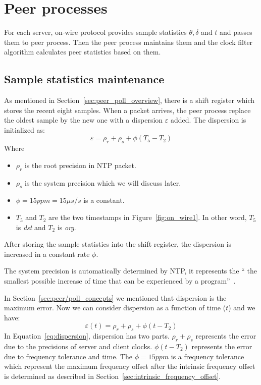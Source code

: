 \section{Peer processes}%
\label{sec:peer_processes}
For each server, on-wire protocol provides sample statistics $\theta, \delta$
and $t$ and passes them to peer process. Then the peer process maintains them
and the clock filter algorithm calculates peer statistics based on them.

\subsection{Sample statistics maintenance}%
\label{sub:sample_statistics_maintenance}
As mentioned in Section~\ref{sec:peer_poll_overview}, there is a shift register
which stores the recent eight samples. When a packet arrives, the peer process
replace the oldest sample by the new one with a dispersion $\varepsilon$ added.
The dispersion is initialized as:
$$ \varepsilon = \rho_r + \rho_s + \phi (T_5 - T_2) $$
Where 
\begin{itemize}
    \item 
        $\rho_r$ is the root precision in NTP packet. 
    \item 
        $\rho_s$ is the system
        precision which we will discuss later.
    \item
        $\phi = 15 ppm = 15 \mu s/s$ is a constant.
    \item
        $T_5$ and $T_2$ are the two timestamps in Figure~\ref{fig:on_wire1}. In
        other word, $T_5$ is \emph{dst} and $T_2$ is \emph{org}.
\end{itemize}
After storing the sample statistics into the shift register, the dispersion
is increased in a constant rate $\phi$. 

The system precision is automatically determined by NTP, it represents the ``
the smallest possible increase of time that can be experienced by a
program''~\cite{precision}.

In Section~\ref{sec:peer/poll_concepts} we mentioned that dispersion is the
maximum error. Now we can consider dispersion as a function of time ($t$) and
we have:
\begin{equation}
    \varepsilon(t) = \rho_r + \rho_s + \phi (t - T_2)
    \label{eq:dispersion}
\end{equation}
In Equation~\ref{eq:dispersion}, dispersion has two parts. $\rho_r + \rho_s$
represents the error due to the precisions of server and client clocks. $\phi
(t - T_2)$ represents the error due to frequency tolerance and time.
The $\phi = 15ppm$ is a frequency tolerance which represent the maximum
frequency offset after the intrinsic frequency offset is determined as
described in Section~\ref{sec:intrinsic_frequency_offset}.

